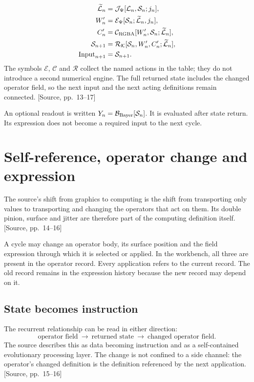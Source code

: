 \documentclass[11pt,a4paper]{article}
\newcommand{\src}[1]{{\sffamily\footnotesize\color{DWGray}[Source, pp.~#1]}}
\newcommand{\Klein}{\mathcal{K}}
\newcommand{\LUT}{\mathcal{L}}
\newcommand{\State}{\mathcal{S}}
\begin{document}
\begin{align}
\widetilde{\LUT}_n&=\mathcal{J}_{\Psi}[\LUT_n,\State_n;j_n],\\
W'_n&=\mathcal{E}_{\Psi}[\State_n;\widetilde{\LUT}_n,j_n],\\
C'_n&=\mathcal{C}_{\rm RGBA}[W'_n,\State_n;\widetilde{\LUT}_n],\\
\State_{n+1}&=\mathcal{R}_{\Klein}
 [\State_n,W'_n,C'_n;\widetilde{\LUT}_n],\\
\operatorname{Input}_{n+1}&=\State_{n+1}.
\end{align}
The symbols $\mathcal{E}$, $\mathcal{C}$ and $\mathcal{R}$ collect the named actions in the table; they do not introduce a second numerical engine. The full returned state includes the changed operator field, so the next input and the next acting definitions remain connected. \src{13--17}

An optional readout is written $Y_n=\mathcal{B}_{\rm Bayer}[\State_n]$. It is evaluated after state return. Its expression does not become a required input to the next cycle.
\clearpage

\section{Self-reference, operator change and expression}
The source's shift from graphics to computing is the shift from transporting only values to transporting and changing the operators that act on them. Its double pinion, surface and jitter are therefore part of the computing definition itself. \src{14--16}

A cycle may change an operator body, its surface position and the field expression through which it is selected or applied. In the workbench, all three are present in the operator record. Every application refers to the current record. The old record remains in the expression history because the new record may depend on it.

\subsection{State becomes instruction}
The recurrent relationship can be read in either direction:
\begin{equation}
\text{operator field}\ \longrightarrow\ \text{returned state}
\ \longrightarrow\ \text{changed operator field}.
\end{equation}
The source describes this as data becoming instruction and as a self-contained evolutionary processing layer. The change is not confined to a side channel: the operator's changed definition is the definition referenced by the next application. \src{15--16}
\end{document}
